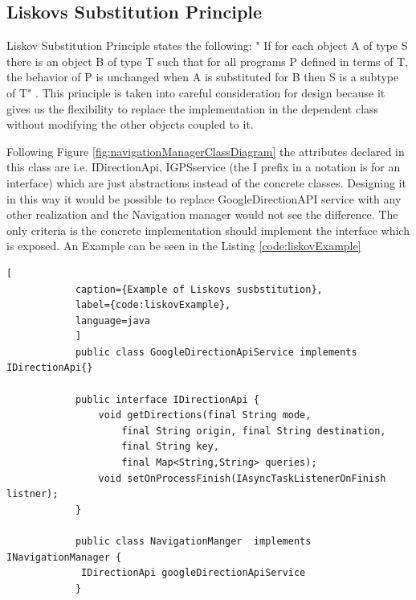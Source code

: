 \subsection{Liskovs Substitution Principle}
    Liskov Substitution Principle states the following: " If for each object A of type S
    there is an object B of type T such that for all programs P defined in terms of T,
    the behavior of P is unchanged when A is substituted for B then S is a subtype of T"  
    \cite{Hotop2015}. This principle is taken into careful consideration for design 
    because it gives us the flexibility to replace the implementation in the dependent 
    class without modifying the other objects coupled to it. 
    \par
        Following Figure \ref{fig:navigationManagerClassDiagram} the attributes declared
        in this class are i.e. IDirectionApi, IGPSservice (the I prefix in a notation is for
        an interface) which are just abstractions instead of the concrete classes.
        Designing it in this way it would be possible to replace GoogleDirectionAPI service
        with any other realization and the Navigation manager would not see the difference.
        The only criteria is the concrete implementation should implement the interface
        which is exposed. An Example can be seen in the Listing \ref{code:liskovExample}

        \newpage
        \begin{lstlisting}[
            caption={Example of Liskovs susbstitution},
            label={code:liskovExample},
            language=java
            ]
            public class GoogleDirectionApiService implements IDirectionApi{}

            public interface IDirectionApi {
                void getDirections(final String mode, 
                    final String origin, final String destination, 
                    final String key, 
                    final Map<String,String> queries);
                void setOnProcessFinish(IAsyncTaskListenerOnFinish listner);
            }

            public class NavigationManger  implements INavigationManager {
             IDirectionApi googleDirectionApiService
            }
             
        \end{lstlisting} 

